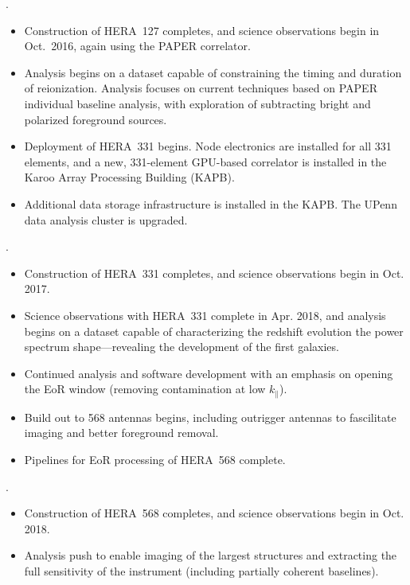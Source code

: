 \documentclass[preprint]{aastex}
\begin{document}
.
\begin{itemize}\setlength{\parskip}{0pt}\itemsep0pt
\vspace{-7pt}
  \item Construction of HERA~127 completes, and science observations begin in Oct.\ 2016, again using the PAPER correlator.
  \item Analysis begins on a dataset capable of constraining the timing and duration of reionization. Analysis focuses on current techniques based on PAPER individual baseline analysis, with exploration of subtracting bright and polarized foreground sources.
  \item Deployment of HERA~331 begins. Node electronics are installed for all 331 elements, and a new, 331-element GPU-based correlator is installed in the Karoo Array Processing Building (KAPB).
  \item  Additional data storage infrastructure is installed in the
KAPB.  The UPenn data analysis cluster is upgraded. 
\end{itemize}

.
\begin{itemize}\setlength{\parskip}{0pt}\itemsep0pt
\vspace{-7pt}
  \item Construction of HERA~331 completes, and science observations begin in Oct. 2017.
  \item Science observations with HERA~331 complete in Apr. 2018, and analysis begins on a dataset capable of
characterizing the redshift evolution the power spectrum shape---revealing the development of the first galaxies.
  \item Continued analysis and software development with an emphasis on opening the EoR window (removing contamination at low $k_{\parallel}$). 
  \item Build out to 568 antennas begins, including outrigger antennas to fascilitate imaging and better foreground removal.
  \item Pipelines for EoR processing of HERA~568 complete.
\end{itemize}

.
\begin{itemize}\setlength{\parskip}{0pt}\itemsep0pt
\vspace{-7pt}
  \item Construction of HERA~568 completes, and science observations begin in Oct. 2018.
  \item Analysis push to enable imaging of the largest structures and extracting the full sensitivity of the instrument (including partially coherent baselines). 
\end{itemize}
\end{document}
